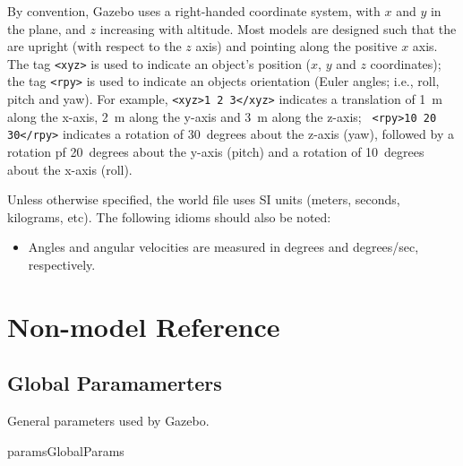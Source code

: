 \documentclass[11pt]{report}
\begin{document}
By convention, Gazebo uses a right-handed coordinate system, with $x$
and $y$ in the plane, and $z$ increasing with altitude.  Most models
are designed such that the are upright (with respect to the $z$ axis)
and pointing along the positive $x$ axis.  The tag {\tt <xyz>} is used
to indicate an object's position ($x$, $y$ and $z$ coordinates); the
tag {\tt <rpy>} is used to indicate an objects orientation (Euler
angles; i.e., roll, pitch and yaw).
%
For example, {\tt <xyz>1 2 3</xyz>} indicates a translation of 1~m
along the x-axis, 2~m along the y-axis and 3~m along the z-axis; {\tt
<rpy>10 20 30</rpy>} indicates a rotation of 30~degrees about the
z-axis (yaw), followed by a rotation pf 20~degrees about the y-axis
(pitch) and a rotation of 10~degrees about the x-axis (roll).

Unless otherwise specified, the world file uses SI units (meters,
seconds, kilograms, etc).  The following idioms should also be noted:
\begin{itemize}
\item Angles and angular velocities are measured in degrees and
degrees/sec, respectively.
\end{itemize}








\chapter{Non-model Reference}
\label{sec.nonmodel.ref}

\section{Global Paramamerters}

General parameters used by Gazebo.

\begin{xmlattrtable}{params}{GlobalParams}
\end{xmlattrtable}
\end{document}
